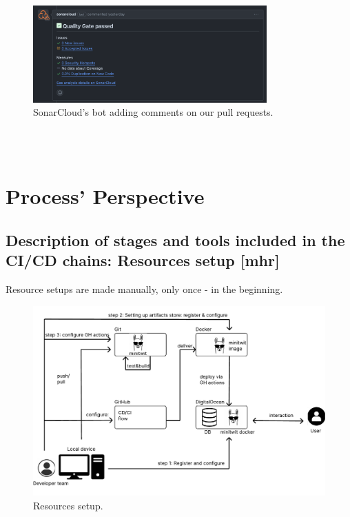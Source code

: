\documentclass{article}
\begin{document}
\begin{figure}[ht]
    \centering
    \includegraphics[width=0.8\textwidth]{./images/SonarCloud_bot.png}
    \caption{SonarCloud's bot adding comments on our pull requests.}
    \label{fig:notion-dashboard}
\end{figure}
\\\\

\section{Process' Perspective}

\subsection{Description of stages and tools included in the CI/CD chains: Resources setup [mhr]}

Resource setups  are made manually, only once - in the beginning.

\begin{figure}[ht]
    \centering
    \includegraphics[width=1.0\textwidth]{./pdfs/resourse setup.pdf} 
    \caption{Resources setup.}
    \label{fig:Resourse setup}
\end{figure}
\end{document}
